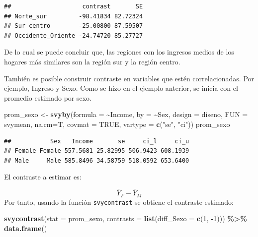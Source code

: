 \documentclass[
  12pt,
]{book}
\newenvironment{Shaded}{\begin{snugshade}}{\end{snugshade}}
\newcommand{\AttributeTok}[1]{\textcolor[rgb]{0.13,0.29,0.53}{#1}}
\newcommand{\ConstantTok}[1]{\textcolor[rgb]{0.56,0.35,0.01}{#1}}
\newcommand{\DecValTok}[1]{\textcolor[rgb]{0.00,0.00,0.81}{#1}}
\newcommand{\FunctionTok}[1]{\textcolor[rgb]{0.13,0.29,0.53}{\textbf{#1}}}
\newcommand{\NormalTok}[1]{#1}
\newcommand{\OtherTok}[1]{\textcolor[rgb]{0.56,0.35,0.01}{#1}}
\newcommand{\SpecialCharTok}[1]{\textcolor[rgb]{0.81,0.36,0.00}{\textbf{#1}}}
\newcommand{\StringTok}[1]{\textcolor[rgb]{0.31,0.60,0.02}{#1}}
\begin{document}
\begin{verbatim}
##                    contrast       SE
## Norte_sur         -98.41834 82.72324
## Sur_centro        -25.00800 87.59507
## Occidente_Oriente -24.74720 85.27727
\end{verbatim}

De lo cual se puede concluir que, las regiones con los ingresos medios de los hogares más similares son la región sur y la región centro.

También es posible construir contraste en variables que estén correlacionadas. Por ejemplo, Ingreso y Sexo. Como se hizo en el ejemplo anterior, se inicia con el promedio estimado por sexo.

\begin{Shaded}
\begin{Highlighting}[]
\NormalTok{prom\_sexo }\OtherTok{\textless{}{-}} \FunctionTok{svyby}\NormalTok{(}\AttributeTok{formula =} \SpecialCharTok{\textasciitilde{}}\NormalTok{Income,}
                   \AttributeTok{by =} \SpecialCharTok{\textasciitilde{}}\NormalTok{Sex,}
                   \AttributeTok{design =}\NormalTok{ diseno,}
                   \AttributeTok{FUN =}\NormalTok{ svymean,}
                   \AttributeTok{na.rm=}\NormalTok{T,}
                   \AttributeTok{covmat =} \ConstantTok{TRUE}\NormalTok{,}
                   \AttributeTok{vartype =} \FunctionTok{c}\NormalTok{(}\StringTok{"se"}\NormalTok{, }\StringTok{"ci"}\NormalTok{))}
\NormalTok{prom\_sexo}
\end{Highlighting}
\end{Shaded}

\begin{verbatim}
##           Sex   Income       se     ci_l     ci_u
## Female Female 557.5681 25.82995 506.9423 608.1939
## Male     Male 585.8496 34.58759 518.0592 653.6400
\end{verbatim}

El contraste a estimar es:

\[ \bar{Y}_{F} - \bar{Y}_{M}\]
Por tanto, usando la función \texttt{svycontrast} se obtiene el contraste estimado:

\begin{Shaded}
\begin{Highlighting}[]
\FunctionTok{svycontrast}\NormalTok{(}\AttributeTok{stat =}\NormalTok{ prom\_sexo,}
            \AttributeTok{contrasts =} \FunctionTok{list}\NormalTok{(}\AttributeTok{diff\_Sexo =} \FunctionTok{c}\NormalTok{(}\DecValTok{1}\NormalTok{, }\SpecialCharTok{{-}}\DecValTok{1}\NormalTok{))) }\SpecialCharTok{\%\textgreater{}\%}
            \FunctionTok{data.frame}\NormalTok{()}
\end{Highlighting}
\end{Shaded}
\end{document}
